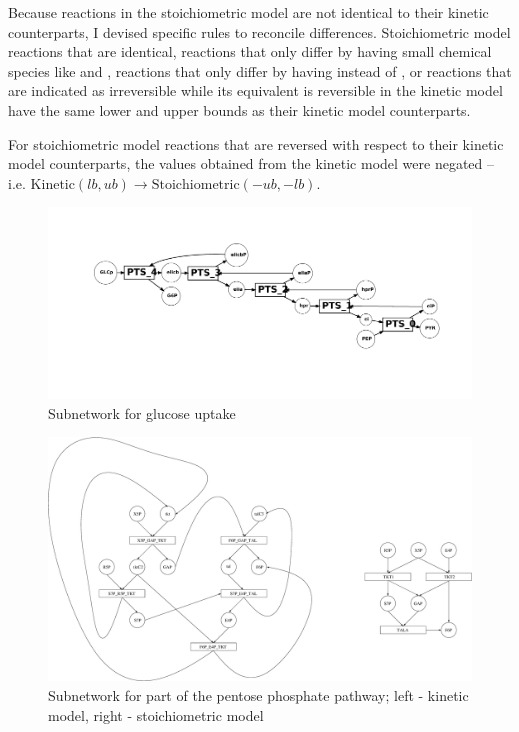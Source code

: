 \documentclass[parskip=full, numbers=noenddot]{scrreprt}
\begin{document}
Because reactions in the stoichiometric model are not identical to their kinetic counterparts, I devised specific rules to reconcile differences. Stoichiometric model reactions that are identical, reactions that only differ by having small chemical species like  and , reactions that only differ by having  instead of , or reactions that are indicated as irreversible while its equivalent is reversible in the kinetic model have the same lower and upper bounds as their kinetic model counterparts.

For stoichiometric model reactions that are reversed with respect to their kinetic model counterparts, the values obtained from the kinetic model were negated -- i.e. $ \mathrm{Kinetic } (lb, ub) \rightarrow \mathrm{Stoichiometric } (-ub, -lb)$.

\begin{figure}[htbp]
  \centering
  \includegraphics[scale=0.4]{glucoseuptake}
  \caption{Subnetwork for glucose uptake}
  \label{fig:glucoseuptake}
\end{figure}

\begin{figure}[htbp]
  \centering
  \includegraphics[scale=0.25]{ppp}
  \caption{Subnetwork for part of the pentose phosphate pathway; left - kinetic model, right - stoichiometric model}
  \label{fig:ppp}
\end{figure}
\end{document}

